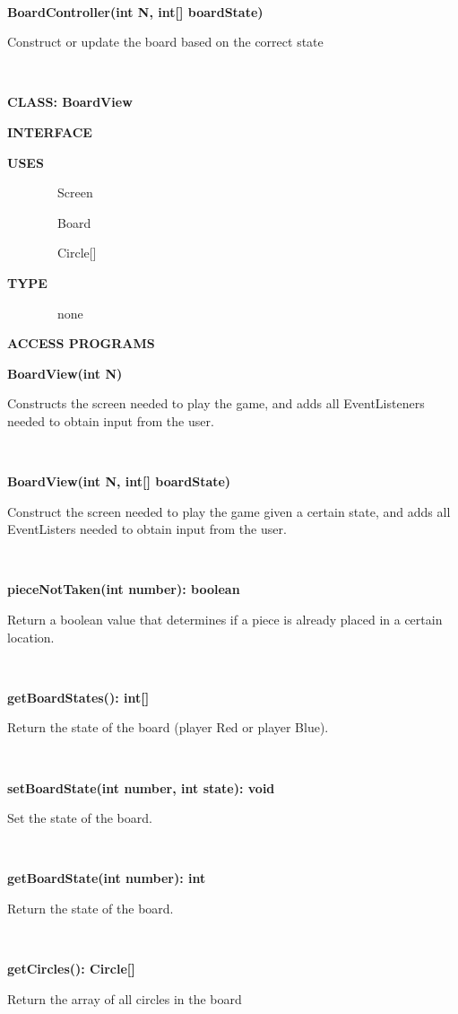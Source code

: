 \documentclass{article}
\begin{document}
{{~~~~~~~~~~~~~~~~}

{\textbf{BoardController(int N, int{[}{]} boardState)}}

{Construct or update the board based on the correct state}

{~}

{\textbf{CLASS: BoardView}}

{\textbf{INTERFACE}}

{\textbf{USES}}

{~~~~~~~~Screen}

{~~~~~~~~Board}

{~~~~~~~~Circle{[}{]}}

{\textbf{TYPE}}

{~~~~~~~~none}

{\textbf{ACCESS PROGRAMS}}

{\textbf{BoardView(int N)}}

{Constructs the screen needed to play the game, and adds all
EventListeners needed to obtain input from the user.}{~~~~~~~~~~~~~~~~}

{~}

{\textbf{BoardView(int N, int{[}{]} boardState)}}

{Construct the screen needed to play the game given a certain
state, and adds all EventListers needed to obtain input from the user.}

{~~~~~~~~~~~~~~~~}

{\textbf{pieceNotTaken(int number): boolean}}

{Return a boolean value that determines if a piece is already
placed in a certain location.}

{~~~~~~~~~~~~~~~~}

{\textbf{getBoardStates(): int{[}{]}}}

{Return the state of the board (player Red or player Blue).}

{~~~~~~~~~~~~~~~~}

{\textbf{setBoardState(int number, int state): void}}

{Set the state of the board.}

{~}

{\textbf{getBoardState(int number): int}}

{Return the state of the board.}

{~~~~~~~~~~~~~~~~}

{\textbf{getCircles(): Circle{[}{]}}}

{Return the array of all circles in the board}

{~~~~~~~~~~~~~~~~}

}
\end{document}
